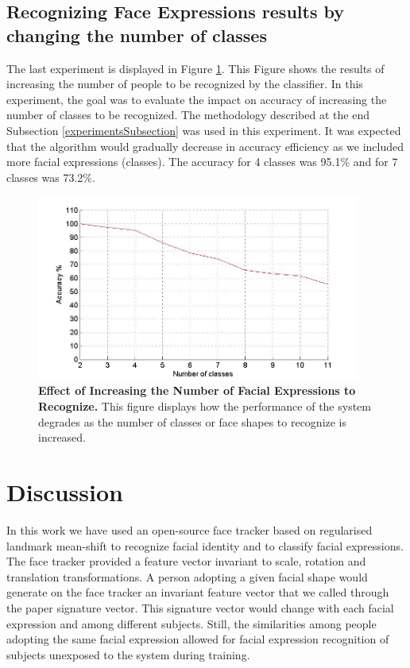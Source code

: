 \documentclass[]{article}
\begin{document}
 
\subsection{Recognizing Face Expressions results by changing the number of
classes}

The last experiment is displayed in Figure \ref{increasingNumberExpressions}. This Figure shows the results of increasing the number
of people to be recognized by the classifier. In this experiment, the goal was to evaluate the impact on accuracy of
increasing  the number of classes to be recognized. The methodology described at the end Subsection
\ref{experimentsSubsection} was used in this experiment. It was expected that the algorithm would gradually decrease in
accuracy efficiency as we included more facial expressions (classes). The accuracy for 4 classes was 95.1\% and for 7
classes was 73.2\%.


\begin{figure}[ht]
\begin{center}
\vspace{-3mm}
\includegraphics[width=0.95\textwidth]{figures/50people_increasing_classes.jpg}
\end{center}
\caption{\textbf{Effect of Increasing the Number of Facial Expressions to Recognize.} This figure displays how the 
performance of the system degrades as the number of classes or face shapes to recognize is increased. }
\label{increasingNumberExpressions}
\end{figure}


\section{Discussion}
In this work we have used an open-source face tracker based on regularised landmark mean-shift to recognize facial
identity and to classify facial expressions. The face tracker provided a feature vector invariant to scale, rotation and
translation transformations. A person adopting a given facial shape would generate on the face tracker an invariant
feature vector that we called through the paper signature vector. This signature vector would change with each facial
expression  and among different subjects. Still, the similarities among people adopting the same facial expression 
allowed for facial expression recognition of subjects unexposed to the system during training.
\end{document}
